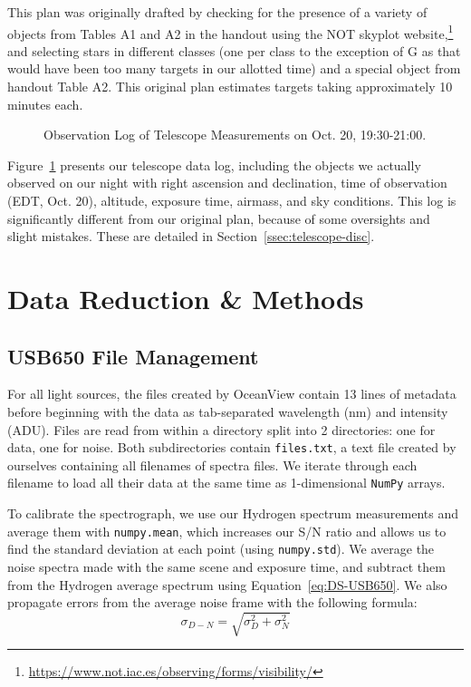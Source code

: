 \documentclass[twocolumn]{aastex702}
\begin{document}
			This plan was originally drafted by checking for the presence of a variety of objects from Tables A1 and A2 in the handout using the NOT skyplot website,\footnote{\href{https://www.not.iac.es/observing/forms/visibility/}{https://www.not.iac.es/observing/forms/visibility/}} and selecting stars in different classes (one per class to the exception of G as that would have been too many targets in our allotted time) and a special object from handout Table A2. This original plan estimates targets taking approximately 10 minutes each.

			\begin{figure}
				\caption{Observation Log of Telescope Measurements on Oct. 20, 19:30-21:00.}
				\label{tab:obs-log}
			\end{figure}
			
			Figure~\ref{tab:obs-log} presents our telescope data log, including the objects we actually observed on our night with right ascension and declination, time of observation (EDT, Oct. 20), altitude, exposure time, airmass, and sky conditions. This log is significantly different from our original plan, because of some oversights and slight mistakes. These are detailed in Section~\ref{ssec:telescope-disc}.
			
  \section{Data Reduction \& Methods}\label{sec:reduc}

		\subsection{USB650 File Management}\label{ssec:USB650-files}
		
			For all light sources, the files created by OceanView contain 13 lines of metadata before beginning with the data as tab-separated wavelength (nm) and intensity (ADU). Files are read from within a directory split into 2 directories: one for data, one for noise. Both subdirectories contain \texttt{files.txt}, a text file created by ourselves containing all filenames of spectra files. We iterate through each filename to load all their data at the same time as 1-dimensional \texttt{NumPy} arrays.
			
			To calibrate the spectrograph, we use our Hydrogen spectrum measurements and average them with \texttt{numpy.mean}, which increases our S/N ratio and allows us to find the standard deviation at each point (using \texttt{numpy.std}). We average the noise spectra made with the same scene and exposure time, and subtract them from the Hydrogen average spectrum using Equation~\ref{eq:DS-USB650}. We also propagate errors from the average noise frame with the following formula:
			\begin{equation}
				\sigma_{D-N} = \sqrt{\sigma_D^2 + \sigma_N^2}
			\end{equation}
			
\end{document}
